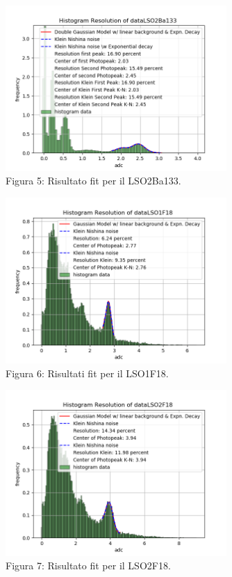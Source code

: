 \documentclass[a4paper]{article}
\begin{document}
\begin{figure}[H]
\centering
\includegraphics[width=0.75\textwidth]{histkleindataLSO2Ba133}
\caption{Figura 5: Risultato fit per il LSO2Ba133.}
\end{figure}
\begin{figure}[H]
\centering
\includegraphics[width=0.75\textwidth]{histkleindataLSO1F18}
\caption{Figura 6: Risultati fit per il LSO1F18.}
\end{figure}
\begin{figure}[H]
\centering
\includegraphics[width=0.75\textwidth]{histkleindataLSO2F18}
\caption{Figura 7: Risultato fit per il LSO2F18.}
\end{figure}
\end{document}
